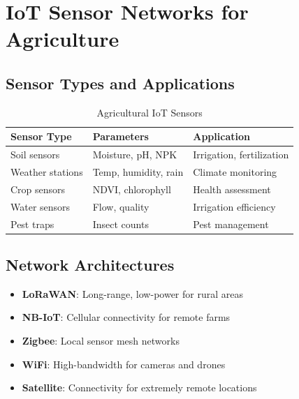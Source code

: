 \documentclass[12pt,a4paper]{article}
\begin{document}
\section{IoT Sensor Networks for Agriculture}

\subsection{Sensor Types and Applications}

\begin{table}[H]
\centering
\caption{Agricultural IoT Sensors}
\begin{tabular}{lll}
\toprule
\textbf{Sensor Type} & \textbf{Parameters} & \textbf{Application} \\
\midrule
Soil sensors & Moisture, pH, NPK & Irrigation, fertilization \\
Weather stations & Temp, humidity, rain & Climate monitoring \\
Crop sensors & NDVI, chlorophyll & Health assessment \\
Water sensors & Flow, quality & Irrigation efficiency \\
Pest traps & Insect counts & Pest management \\
\bottomrule
\end{tabular}
\end{table}

\subsection{Network Architectures}

\begin{tcolorbox}[colback=agrigreen!10, colframe=agrigreen, title=Agricultural IoT Networks]
\begin{itemize}
    \item \textbf{LoRaWAN}: Long-range, low-power for rural areas
    \item \textbf{NB-IoT}: Cellular connectivity for remote farms
    \item \textbf{Zigbee}: Local sensor mesh networks
    \item \textbf{WiFi}: High-bandwidth for cameras and drones
    \item \textbf{Satellite}: Connectivity for extremely remote locations
\end{itemize}
\end{tcolorbox}
\end{document}
